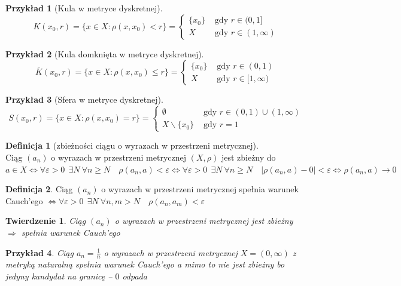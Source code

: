\documentclass[12pt,a4paper]{article}
\newtheorem{tw}{Twierdzenie}
\newtheorem{przyklad}{Przykład}
\theoremstyle{definition}
\newtheorem{df}{Definicja}
\begin{document}
\begin{przyklad}[Kula w metryce dyskretnej]
$$K(x_0, r) = \{x\in X: \rho(x,x_0) < r\} = \begin{cases}
	\{x_0\} &\text{ gdy } r\in (0,1]\\
	X &\text{ gdy } r\in (1, \infty)
\end{cases}$$
\end{przyklad}
\begin{przyklad}[Kula domknięta w metryce dyskretnej]
$$\overline{K}(x_0, r) = \{x\in X: \rho(x,x_0) \leqslant r\} = \begin{cases}
	\{x_0\} &\text{ gdy } r\in (0,1)\\
	X &\text{ gdy } r\in [1, \infty)
\end{cases}$$
\end{przyklad}
\begin{przyklad}[Sfera w metryce dyskretnej]
$$S(x_0, r) = \{x\in X: \rho(x,x_0) = r\} = \begin{cases}
	\emptyset &\text{ gdy } r\in (0,1) \cup (1,\infty)\\
	X\smallsetminus\{x_0\} &\text{ gdy } r=1
\end{cases}$$
\end{przyklad}

\begin{df}[zbieżności ciągu o wyrazach w przestrzeni metrycznej]~\\
Ciąg $(a_n)$ o wyrazach w przestrzeni metrycznej $(X, \rho)$ jest zbieżny do $a\in X \Leftrightarrow \forall\varepsilon >0~~ \exists N ~ \forall n \geqslant N \quad \rho(a_n, a) < \varepsilon \Leftrightarrow \forall\varepsilon >0~~ \exists N ~ \forall n \geqslant N \quad |\rho(a_n, a) - 0| < \varepsilon \Leftrightarrow \rho(a_n, a) \rightarrow 0$
\end{df}

\begin{df}
Ciąg $(a_n)$ o wyrazach w przestrzeni metrycznej spełnia warunek Cauch'ego $\Leftrightarrow \forall \varepsilon >0 ~~ \exists N ~ \forall n,m > N \quad \rho(a_n, a_m) < \varepsilon$
\end{df}

\begin{tw}
Ciąg $(a_n)$ o wyrazach w przestrzeni metrycznej jest zbieżny $\Rightarrow$ spełnia warunek Cauch'ego
\end{tw}

\begin{przyklad}
Ciąg $a_n = \frac{1}{n}$ o wyrazach w przestrzeni metrycznej $X = (0, \infty)$ z metryką naturalną spełnia warunek Cauch'ego a mimo to nie jest zbieżny bo jedyny kandydat na granicę -- $0$ odpada
\end{przyklad}
\end{document}
